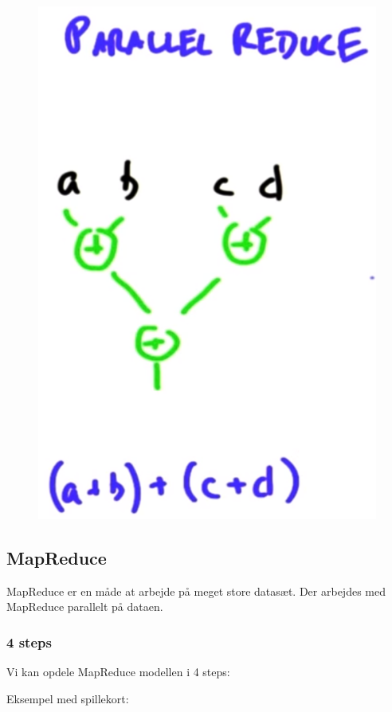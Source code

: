 \begin{figure}[H]
\begin{minipage}{.4\textwidth}
		\includegraphics[width=0.8\linewidth]{figs/aggregation/paraReduce}
		\label{paraReduce}
	\end{minipage}
\end{figure}

\subsection{MapReduce}
MapReduce er en måde at arbejde på meget store datasæt. Der arbejdes med MapReduce parallelt på dataen.

\subsubsection{4 steps}
Vi kan opdele MapReduce modellen i 4 steps:

Eksempel med spillekort:

